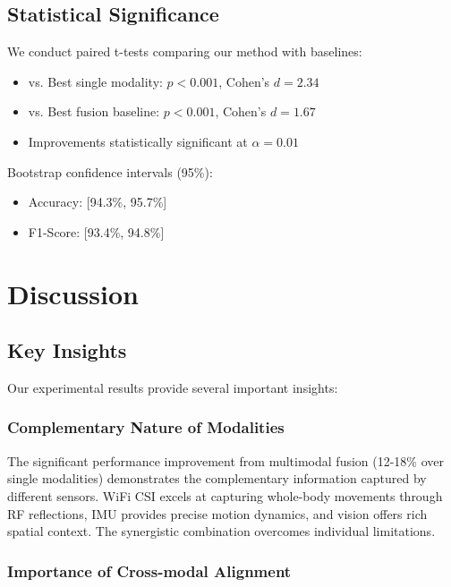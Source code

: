 \documentclass[journal]{IEEEtran}
\begin{document}
\subsection{Statistical Significance}

We conduct paired t-tests comparing our method with baselines:

\begin{itemize}
\item vs. Best single modality: $p < 0.001$, Cohen's $d = 2.34$
\item vs. Best fusion baseline: $p < 0.001$, Cohen's $d = 1.67$
\item Improvements statistically significant at $\alpha = 0.01$
\end{itemize}

Bootstrap confidence intervals (95\%):
\begin{itemize}
\item Accuracy: [94.3\%, 95.7\%]
\item F1-Score: [93.4\%, 94.8\%]
\end{itemize}

\section{Discussion}

\subsection{Key Insights}

Our experimental results provide several important insights:

\subsubsection{Complementary Nature of Modalities}

The significant performance improvement from multimodal fusion (12-18\% over single modalities) demonstrates the complementary information captured by different sensors. WiFi CSI excels at capturing whole-body movements through RF reflections, IMU provides precise motion dynamics, and vision offers rich spatial context. The synergistic combination overcomes individual limitations.

\subsubsection{Importance of Cross-modal Alignment}
\end{document}
